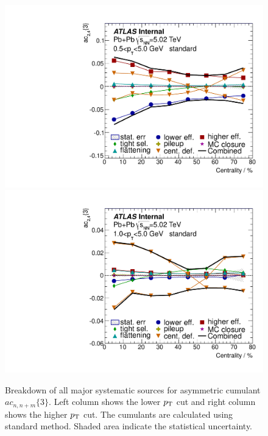 \begin{figure}[H]
\centering
\includegraphics[width=.425\linewidth]{figs/chapter_appendix/sys_ac_1sub_Har2_Pt0.pdf}
\includegraphics[width=.425\linewidth]{figs/chapter_appendix/sys_ac_1sub_Har2_Pt1.pdf}
\caption{Breakdown of all major systematic sources for asymmetric cumulant $ac_{n,n+m}\{3\}$. Left column shows the lower $p_\text{T}$ cut and right column shows the higher $p_\text{T}$ cut. The cumulants are calculated using standard method. Shaded area indicate the statistical uncertainty.}
\end{figure}



